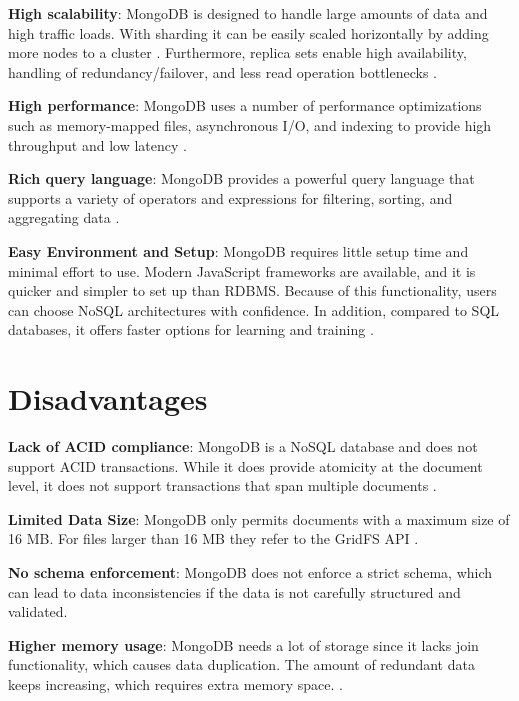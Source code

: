 \textbf{High scalability}: MongoDB is designed to handle large amounts of data and high traffic loads. With sharding it can be easily scaled horizontally by adding more nodes to a cluster \parencite{mongodb-scalability, dataflair_2018}. Furthermore, replica sets enable high availability, handling of redundancy/failover, and less read operation bottlenecks \parencite{mongodb-replica-sets}.

\textbf{High performance}: MongoDB uses a number of performance optimizations such as memory-mapped files, asynchronous I/O, and indexing to provide high throughput and low latency \parencite{mongodb-performance, knowledgenile-pro-con}.

\textbf{Rich query language}: MongoDB provides a powerful query language that supports a variety of operators and expressions for filtering, sorting, and aggregating data \parencite{mongodb-query}.

\textbf{Easy Environment and Setup}: MongoDB requires little setup time and minimal effort to use. Modern JavaScript frameworks are available, and it is quicker and simpler to set up than \ac{RDBMS}.
Because of this functionality, users can choose NoSQL architectures with confidence. In addition, compared to SQL databases, it offers faster options for learning and training \parencite{knowledgenile-pro-con, jamsheer_2019}.

\section{Disadvantages}

\textbf{Lack of ACID compliance}: MongoDB is a \ac{NoSQL} database and does not support \ac{ACID} transactions. While it does provide atomicity at the document level, it does not support transactions that span multiple documents \parencite{mongodb-transactions, knowledgenile-pro-con}.

\textbf{Limited Data Size}: MongoDB only permits documents with a maximum size of 16 MB. For files larger than 16 MB they refer to the GridFS \ac{API} \parencite{mongodb-documents}.

\textbf{No schema enforcement}: MongoDB does not enforce a strict schema, which can lead to data inconsistencies if the data is not carefully structured and validated.

\textbf{Higher memory usage}: MongoDB needs a lot of storage since it lacks join functionality, which causes data duplication. The amount of redundant data keeps increasing, which requires extra memory space. \parencite{knowledgenile-pro-con}.

